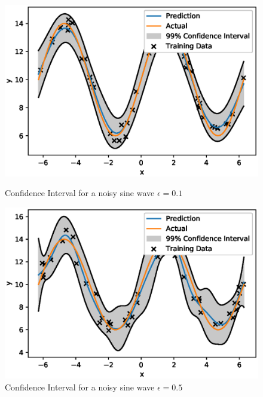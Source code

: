 \begin{figure}[H]
\centering
\begin{minipage}{.5\textwidth}
  \centering
        \includegraphics[width=\textwidth]{images/GP_Explanation/0_1_noise_confidence_interval.eps}
        
        \caption{Confidence Interval for a noisy sine wave $\epsilon = 0.1 $}
        \label{fig:0_1_confidence_interval}
\end{minipage}%
\begin{minipage}{.5\textwidth}
  \centering
        \includegraphics[width=\textwidth]{images/GP_Explanation/0_5_noise_confidence_interval.eps}
        \caption{Confidence Interval for a noisy sine wave $\epsilon = 0.5 $}
        \label{fig:0_5_confidence_interval}
\end{minipage}
\end{figure}